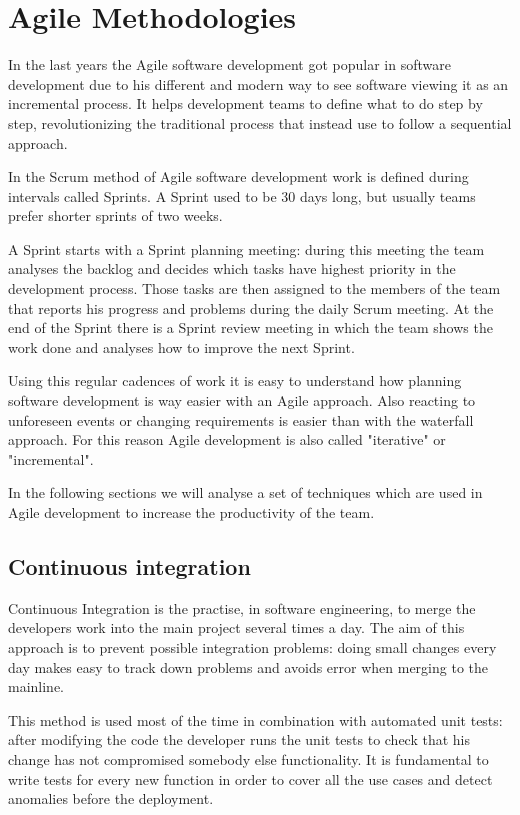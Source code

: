 \section{Agile Methodologies}

In the last years the Agile software development got popular in software
development due to his different and modern way to see software viewing it as
an incremental process. It helps development teams to define what to do step by
step, revolutionizing the traditional process that instead use to follow
a sequential approach.

In the Scrum method of Agile software development work is defined during
intervals called Sprints. A Sprint used to be 30 days long, but usually teams
prefer shorter sprints of two weeks.

A Sprint starts with a Sprint planning meeting: during this meeting the team
analyses the backlog and decides which tasks have highest priority in the
development process. Those tasks are then assigned to the members of the team
that reports his progress and problems during the daily Scrum meeting. At the
end of the Sprint there is a Sprint review meeting in which the team shows the
work done and analyses how to improve the next Sprint.

Using this regular cadences of work it is easy to understand how planning
software development is way easier with an Agile approach. Also reacting to
unforeseen events or changing requirements is easier than with the waterfall
approach. For this reason Agile development is also called "iterative" or
"incremental".

In the following sections we will analyse a set of techniques which are used in
Agile development to increase the productivity of the team.

\subsection{Continuous integration}

Continuous Integration is the practise, in software engineering, to merge the
developers work into the main project several times a day. The aim of this
approach is to prevent possible integration problems: doing small changes every
day makes easy to track down problems and avoids error when merging to the
mainline.

This method is used most of the time in combination with automated unit tests:
after modifying the code the developer runs the unit tests to check that his
change has not compromised somebody else functionality. It is fundamental to
write tests for every new function in order to cover all the use cases and
detect anomalies before the deployment.


